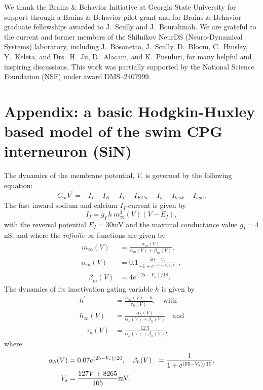 \documentclass[nofootinbib,aip,amsmath,amssymb,preprint,twocolumn,floatfix,10pt]{revtex4-2}
\begin{document}
\begin{acknowledgments}
We thank the Brains \& Behavior Initiative at Georgia State University for support through a Brains \& Behavior pilot grant and for Brains \& Behavior graduate fellowships awarded to J.~Scully and J.~Bourahmah. We are grateful to the current and former members of the Shilnikov NeurDS (Neuro-Dynamical Systems) laboratory, including J.~Bosonetto, J.~Scully, D.~Bloom, C.~Hinsley, Y.~Keleta, and Drs.~H.~Ju, D.~Alacam, and K.~Pusuluri, for many helpful and inspiring discussions. This work was partially supported by the National Science Foundation (NSF) under award DMS--2407999.
\end{acknowledgments}

\label{fig:supp} 
\section*{Appendix: a basic Hodgkin-Huxley based model of the swim CPG interneuron (SiN)} \label{sec:appendix1}
The dynamics of the membrane potential, $V$, is governed by the following equation:
\begin{equation}
 	C_{m} {V}^\prime = -I_{I} - I_K - I_{T}  - I_{KCa} -  I_{h}  - I_{leak}  - I_{syn}.  \label{a1}
 \end{equation}
 The fast inward sodium and calcium $I_{I}$-current is given by   
\begin{equation}
I_{I}=g_{I}\,h\, m^{3}_{\infty}(V)(V-E_{I}), 
 \end{equation}
with the reversal potential $E_{I}=30$mV and the maximal conductance value $g_{I}=4$nS, and where the {\em infinite $\infty$ } functions are given by   
\begin{align}
 m_{\infty}(V) &= \frac{\alpha_{m}(V)}{\alpha_{m}(V) +\beta_{m}(V)},   \\
 \alpha_{m}(V) &= 0.1 \frac{50-V_s}{-1+e^{(50-V_s)/10}}\ , \\ 
 \quad \beta_{m}(V) &= 4 e^{(25-V_s)/18}.  
\end{align}
 The dynamics of its inactivation  gating variable $h$ is given by      
\begin{align}
 {h}^\prime &=  \frac{h_{\infty}(V)-h}{ {\tau_{h}(V)} }, \quad \mbox{with} \quad \\
h_{\infty}(V) &= \frac{\alpha_{h}(V)}{\alpha_{h}(V) +\beta_{h}(V)}\quad \mbox{and} \\
 \quad \tau_{h}(V) &= \frac{12.5}{\alpha_{h}(V) +\beta_{h}(V)}, 
\end{align}
where 
 \begin{align}
 \alpha_{h}(V) &= 0.07 e^{(25-V_s)/20}, \quad 
 \beta_{h}(V) &= \frac{1}{1+e^{(55-V_s)/10}}, \\
 V_s &= \frac{127V+8265}{105}{\rm mV}.
 \end{align} 
\end{document}
